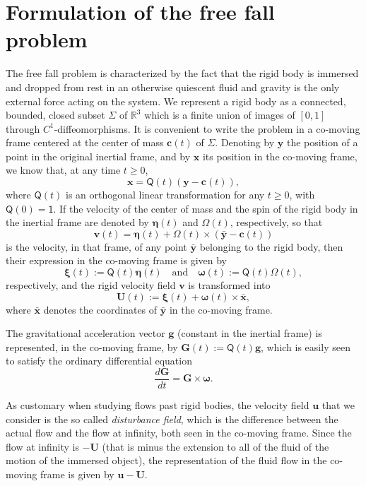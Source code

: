 \documentclass[final]{amsart}
\theoremstyle{definition}
\theoremstyle{definition}
\theoremstyle{remark}
\begin{document}
\section{Formulation of the free fall problem}\label{sec:formulation}

The free fall problem is characterized by the fact that the rigid body
is immersed and dropped from rest in an otherwise quiescent fluid and
gravity is the only external force acting on the system.  We represent
a rigid body as a connected, bounded, closed subset ${\Sigma}$ of ${\mathbb R}^3$
which is a finite union of images of $[0,1]$ through 
$C^1$-diffeomorphisms.  It is convenient to write the problem in a
co-moving frame centered at the center of mass ${\boldsymbol c}(t)$ of
${\Sigma}$.  Denoting by ${\boldsymbol y}$ the position of a point in the original
inertial frame, and by ${\boldsymbol x}$ its position in the co-moving frame, we
know that, at any time $t\geq 0$,
\[
{\boldsymbol x}={\mathsf Q}(t)({\boldsymbol y}-{\boldsymbol c}(t)),
\]
where ${\mathsf Q}(t)$ is an orthogonal linear transformation for any $t\geq 0$, with ${\mathsf Q}(0)={\mathsf 1}$.
If the velocity of the center of mass and the spin of the rigid body in the inertial frame are denoted by ${\boldsymbol \eta}(t)$ and ${\boldsymbol \varOmega}(t)$, respectively, so that
\[
{\boldsymbol v}(t)={\boldsymbol \eta}(t)+{\boldsymbol \varOmega}(t)\times(\bar{{\boldsymbol y}}-{\boldsymbol c}(t))
\]
is the velocity, in that frame, of any point $\bar{{\boldsymbol y}}$ belonging to the rigid body, then their expression in the co-moving frame is given by
\[
{\boldsymbol \xi}(t):={\mathsf Q}(t){\boldsymbol \eta}(t)\quad\text{and}\quad{\boldsymbol \omega}(t):={\mathsf Q}(t){\boldsymbol \varOmega}(t),
\]
respectively, and the rigid velocity field ${\boldsymbol v}$ is transformed into
\[
{\boldsymbol U}(t):={\boldsymbol \xi}(t)+{\boldsymbol \omega}(t)\times\bar{{\boldsymbol x}}, 
\]
where $\bar{{\boldsymbol x}}$ denotes the coordinates of $\bar{{\boldsymbol y}}$ in the co-moving frame.

The gravitational acceleration vector ${\boldsymbol g}$ (constant in the
inertial frame) is represented, in the co-moving frame, by ${\boldsymbol G}(t):={\mathsf Q}(t){\boldsymbol g}$, which is easily seen to satisfy the
ordinary differential equation
\begin{equation}\label{eq:G}
\frac{d{\boldsymbol G}}{dt}={\boldsymbol G}\times{\boldsymbol \omega}.
\end{equation}

As customary when studying flows past rigid bodies, the velocity field
${\boldsymbol u}$ that we consider is the so called \emph{disturbance field},
which is the difference between the actual flow and the flow at
infinity, both seen in the co-moving frame. Since the flow at infinity
is $-{\boldsymbol U}$ (that is minus the extension to all of the fluid of the
motion of the immersed object), the representation of the fluid flow
in the co-moving frame is given by ${\boldsymbol u}-{\boldsymbol U}$.
\end{document}
